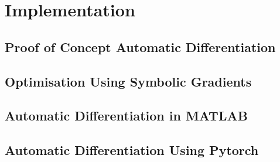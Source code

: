 
\chapter{Implementation}

\section{Proof of Concept Automatic Differentiation}

\section{Optimisation Using Symbolic Gradients}

\section{Automatic Differentiation in MATLAB}%

\section{Automatic Differentiation Using Pytorch}%

